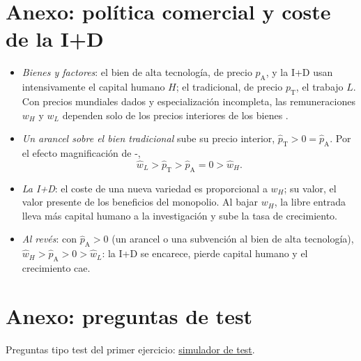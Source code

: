 \documentclass[11pt]{article}
\begin{document}
\section{Anexo: política comercial y coste de la I+D}\label{anexo:grossman-helpman}

\begin{itemize}
\item \emph{Bienes y factores}\nocite{GrossmanHelpman1991Small}: el bien de alta tecnología, de precio $p_{\mathrm A}$, y la I+D usan intensivamente el capital humano $H$; el tradicional, de precio $p_{\mathrm T}$, el trabajo $L$. Con precios mundiales dados y especialización incompleta, las remuneraciones $w_H$ y $w_L$ dependen solo de los precios interiores de los bienes .
\item \emph{Un arancel sobre el bien tradicional} sube su precio interior, $\hat p_{\mathrm T}>0=\hat p_{\mathrm A}$. Por el efecto magnificación de -,
  \[
  \hat w_L>\hat p_{\mathrm T}>\hat p_{\mathrm A}=0>\hat w_H.
  \]
\item \emph{La I+D}: el coste de una nueva variedad es proporcional a $w_H$; su valor, el valor presente de los beneficios del monopolio. Al bajar $w_H$, la libre entrada lleva más capital humano a la investigación y sube la tasa de crecimiento.
\item \emph{Al revés}: con $\hat p_{\mathrm A}>0$ (un arancel o una subvención al bien de alta tecnología), $\hat w_H>\hat p_{\mathrm A}>0>\hat w_L$: la I+D se encarece, pierde capital humano y el crecimiento cae.\findemo
\end{itemize}

\section{Anexo: preguntas de test}\label{anexo:test}

\begin{anotaciones}
Preguntas tipo test del primer ejercicio: \href{https://www.victorgutierrezmarcos.es/oposicion/temario/primer-ejercicio/test/simulador.html?tema=3.B.9}{simulador de test}.
\end{anotaciones}

\nocite{Gandolfo2014International,AppleyardField2014International,Feenstra2016Advanced}
\bibliografia
\end{document}
